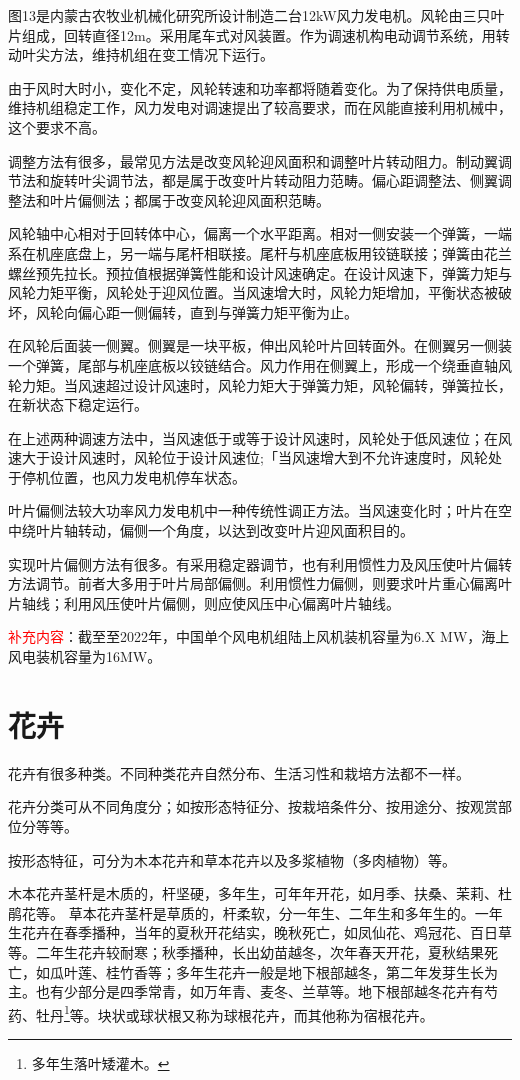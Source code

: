 \documentclass{ctexbook}
\begin{document}
图13是内蒙古农牧业机械化研究所设计制造二台12kW风力发电机。风轮由三只叶片组成，回转直径12m。采用尾车式对风装置。作为调速机构电动调节系统，用转动叶尖方法，维持机组在变工情况下运行。

由于风时大时小，变化不定，风轮转速和功率都将随着变化。为了保持供电质量，维持机组稳定工作，风力发电对调速提出了较高要求，而在风能直接利用机械中，这个要求不高。

调整方法有很多，最常见方法是改变风轮迎风面积和调整叶片转动阻力。制动翼调节法和旋转叶尖调节法，都是属于改变叶片转动阻力范畴。偏心距调整法、侧翼调整法和叶片偏侧法；都属于改变风轮迎风面积范畴。

风轮轴中心相对于回转体中心，偏离一个水平距离。相对一侧安装一个弹簧，一端系在机座底盘上，另一端与尾杆相联接。尾杆与机座底板用铰链联接；弹簧由花兰螺丝预先拉长。预拉值根据弹簧性能和设计风速确定。在设计风速下，弹簧力矩与风轮力矩平衡，风轮处于迎风位置。当风速增大时，风轮力矩增加，平衡状态被破坏，风轮向偏心距一侧偏转，直到与弹簧力矩平衡为止。

在风轮后面装一侧翼。侧翼是一块平板，伸出风轮叶片回转面外。在侧翼另一侧装一个弹簧，尾部与机座底板以铰链结合。风力作用在侧翼上，形成一个绕垂直轴风轮力矩。当风速超过设计风速时，风轮力矩大于弹簧力矩，风轮偏转，弹簧拉长，在新状态下稳定运行。
	
在上述两种调速方法中，当风速低于或等于设计风速时，风轮处于低风速位；在风速大于设计风速时，风轮位于设计风速位;「当风速增大到不允许速度时，风轮处于停机位置，也风力发电机停车状态。

叶片偏侧法较大功率风力发电机中一种传统性调正方法。当风速变化时；叶片在空中绕叶片轴转动，偏侧一个角度，以达到改变叶片迎风面积目的。

实现叶片偏侧方法有很多。有采用稳定器调节，也有利用惯性力及风压使叶片偏转方法调节。前者大多用于叶片局部偏侧。利用惯性力偏侧，则要求叶片重心偏离叶片轴线；利用风压使叶片偏侧，则应使风压中心偏离叶片轴线。

\textcolor{red}{补充内容}：截至至2022年，中国单个风电机组陆上风机装机容量为6.X MW，海上风电装机容量为16MW。
\chapter{花卉}
花卉有很多种类。不同种类花卉自然分布、生活习性和栽培方法都不一样。

花卉分类可从不同角度分；如按形态特征分、按栽培条件分、按用途分、按观赏部位分等等。

按形态特征，可分为木本花卉和草本花卉以及多浆植物（多肉植物）等。

木本花卉茎杆是木质的，杆坚硬，多年生，可年年开花，如月季、扶桑、茉莉、杜鹃花等。
草本花卉茎杆是草质的，杆柔软，分一年生、二年生和多年生的。一年生花卉在春季播种，当年的夏秋开花结实，晚秋死亡，如凤仙花、鸡冠花、百日草等。二年生花卉较耐寒；秋季播种，长出幼苗越冬，次年春天开花，夏秋结果死亡，如瓜叶莲、桂竹香等；多年生花卉一般是地下根部越冬，第二年发芽生长为主。也有少部分是四季常青，如万年青、麦冬、兰草等。地下根部越冬花卉有芍药、牡丹\footnote{多年生落叶矮灌木。}等。块状或球状根又称为球根花卉，而其他称为宿根花卉。
\end{document}
